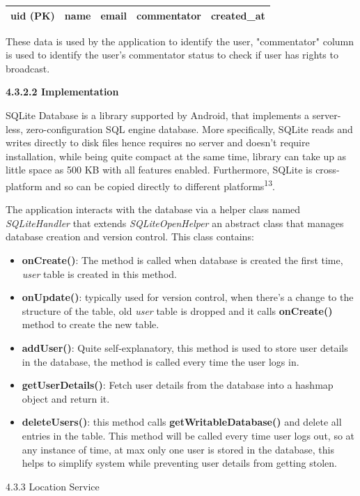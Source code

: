 \documentclass{article}
\begin{document}
\begin{flushleft}
\begin{tabular}{| c | c | c | c | c |}
\hline
uid (PK) & name & email & commentator & created\_at\\
\hline
\end{tabular}\par
These data is used by the application to identify the user, "commentator" column is used to identify the user's commentator status to check if user has rights to broadcast.\par
{\textbf {4.3.2.2 Implementation}}\par
SQLite Database is a library supported by Android, that implements a server-less, zero-configuration SQL engine database. More specifically, SQLite reads and writes directly to disk files hence requires no server and doesn't require installation, while being quite compact at the same time, library can take up as little space as 500 KB with all features enabled. Furthermore, SQLite is cross-platform and so can be copied directly to different platforms\textsuperscript{13}.\par
The application interacts with the database via a helper class named \textit{SQLiteHandler} that extends \textit{SQLiteOpenHelper} an abstract class that manages database creation and version control. This class contains:
\begin{itemize}
	\item \textbf{onCreate()}: The method is called when database is created the first time, \textit{user} table is created in this method.
	\item \textbf{onUpdate()}: typically used for version control, when there's a change to the structure of the table, old \textit{user} table is dropped and it calls \textbf{onCreate()} method to create the new table.
	\item \textbf{addUser()}: Quite self-explanatory, this method is used to store user details in the database, the method is called every time the user logs in.
	\item \textbf{getUserDetails()}: Fetch user details from the database into a hashmap object and return it.
	\item \textbf{deleteUsers()}: this method calls \textbf{getWritableDatabase()} and delete all entries in the table. This method will be called every time user logs out, so at any instance of time, at max only one user is stored in the database, this helps to simplify system while preventing user details from getting stolen.
\end{itemize}
{\large 4.3.3 Location Service}\par

\end{flushleft}
\end{document}
